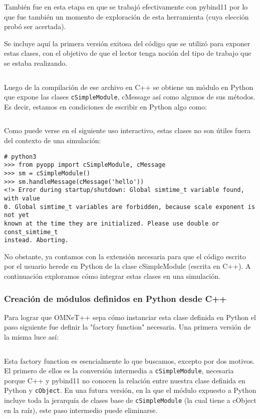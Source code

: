 \documentclass[]{article}
\begin{document}
También fue en esta etapa en que se trabajó efectivamente con pybind11 por lo
que fue también un momento de exploración de esta herramienta (cuya elección
probó ser acertada).

Se incluye aquí la primera versión exitosa del código que se utilizó para
exponer estas clases, con el objetivo de que el lector tenga noción del tipo de
trabajo que se estaba realizando.

\inputminted{c++}{codelistings/binding.cc}

Luego de la compilación de ese archivo en C++ se obtiene un módulo en Python
que expone las clases \verb!cSimpleModule!, cMessage así como algunos de sus
métodos. Es decir, estamos en condiciones de escribir en Python algo como:

\inputminted{Python}{codelistings/binding_usage.py}

Como puede verse en el siguiente uso interactivo, estas clases no son útiles
fuera del contexto de una simulación:

\begin{verbatim}
# python3
>>> from pyopp import cSimpleModule, cMessage
>>> sm = cSimpleModule()
>>> sm.handleMessage(cMessage('hello'))
<!> Error during startup/shutdown: Global simtime_t variable found, with value
0. Global simtime_t variables are forbidden, because scale exponent is not yet
known at the time they are initialized. Please use double or const_simtime_t
instead. Aborting.
\end{verbatim}

No obstante, ya contamos con la extensión necesaria para que el código escrito
por el usuario herede en Python de la clase cSimpleModule (escrita en C++). A
continuación exploramos cómo integrar estas clases en una simulación.

\subsubsection{Creación de módulos definidos en Python desde C++}

Para lograr que OMNeT++ sepa cómo instanciar esta clase definida en Python el
paso siguiente fue definir la "factory function" necesaria. Una primera versión
de la misma luce así:

\inputminted{c++}{codelistings/factory_function.cc}

Esta factory function es esencialmente lo que buscamos, excepto por dos
motivos. El primero de ellos es la conversión intermedia a
\verb!cSimpleModule!, necesaria porque C++ y pybind11 no conocen la relación
entre nuestra clase definida en Python y \verb!cObject!. En una futura versión,
en la que el módulo expuesto a Python incluye toda la jerarquía de clases base
de \verb!cSimpleModule! (la cual tiene a cObject en la raíz), este paso
intermedio puede eliminarse.
\end{document}
